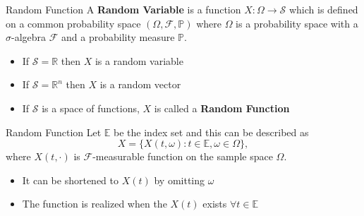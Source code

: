 \documentclass{beamer}
\begin{document}

	\begin{frame}{Random Function}
		A \textbf{Random Variable} is a function $X : \Omega \rightarrow \mathcal{S}$ which is defined on a common probability space $(\Omega, \mathcal{F}, \mathbb{P})$ where $\Omega$ is a probability space with a $\sigma$-algebra $\mathcal{F}$ and a probability measure $\mathbb{{P}}.$
		\begin{itemize}
			\item If $\mathcal{S} = \mathbb{R}$ then $X$ is a random variable
			\item If $\mathcal{S} = \mathbb{R}^{n}$ then $X$ is a random vector
			\item If $\mathcal{S}$ is a space of functions, $X$ is called a \textbf{Random Function}
		\end{itemize}
	\end{frame}

	\begin{frame}{Random Function}
		Let $\mathbb{E}$ be the index set and this can be described as
		$${X = \{X(t,\omega) : t \in \mathbb{E}, \omega \in \Omega\},}$$
		where $X(t, \cdot)$ is $\mathcal{F}$-measurable function on the sample space $\Omega$.\\
		\begin{itemize}
			\item It can be shortened to $X(t)$ by omitting $\omega$
			\item The function is realized when the $X(t)$ exists $\forall t \in \mathbb{E}$
		\end{itemize}
	\end{frame}
\end{document}
